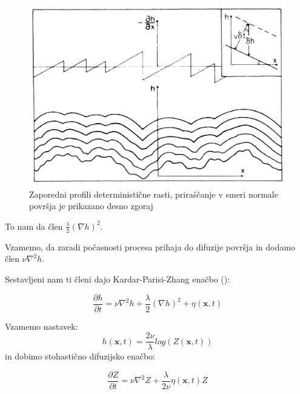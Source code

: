 \documentclass[a4paper, oneside, 12pt]{book}
\begin{document}
            \begin{figure}[H]
              \begin{center}
                \includegraphics[width=12cm]{slike/kpz}
              \end{center}
              \caption{Zaporedni profili deterministične rasti, priraščanje v smeri normale površja je prikazano desno zgoraj}
              \label{fig:kpz}
            \end{figure}

            To nam da člen $\frac{\lambda}{2} (\nabla h)^2$.

            Vzamemo, da zaradi počasnosti procesa prihaja do difuzije površja in dodamo člen $\nu \nabla^2 h$.

            Sestavljeni nam ti členi dajo Kardar-Parisi-Zhang enačbo (\cite{kardar1986dynamic}):

            \begin{equation}
              \frac{\partial h}{\partial t} = \nu \nabla^2 h + \frac{\lambda}{2} (\nabla h)^2 + \eta (\mathbf{x},t)
              \label{KPZ}
            \end{equation}

            Vzamemo nastavek:
        \begin{equation}
            h(\mathbf{x},t) = \frac{2 \nu}{\lambda} log(Z(\mathbf{x},t))
        \end{equation}
            in dobimo stohastično difuzijsko enačbo:

        \begin{equation}
            \frac{\partial Z}{\partial t} = \nu \nabla^2 Z + \frac{\lambda}{2 \nu} \eta(\mathbf{x},t) Z
        \end{equation}
\end{document}
